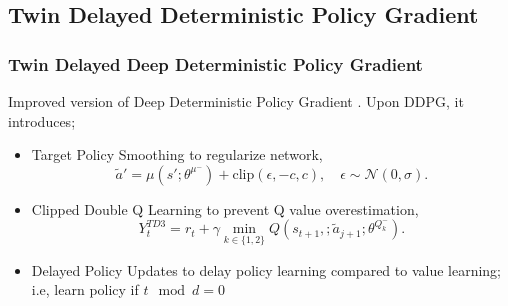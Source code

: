 \documentclass{beamer}
\begin{document}
\subsection{Twin Delayed Deterministic Policy Gradient}
\begin{frame}
\frametitle{Twin Delayed Deep Deterministic Policy Gradient}
Improved version of Deep Deterministic Policy Gradient \cite{fujimoto_addressing_2018}.
Upon DDPG, it introduces;
\begin{itemize}
	\item Target Policy Smoothing to regularize network,
	\begin{equation}
	\label{eqn:td3_target_action}
	\widetilde{a}' = \mu(s';\theta^{\mu^-}) + \text{clip}(\epsilon, -c, c), \quad \epsilon \sim \mathcal{N}(0, \sigma).
	\end{equation}
	\item Clipped Double Q Learning to prevent Q value overestimation,
	\begin{equation}
	\label{eqn:td3_target}
	Y_t^{TD3} = r_t + \gamma \min_{k\in\{1,2\}} Q(s_{t+1}, ;\widetilde{a}_{j+1};\theta^{Q_k^-}).
	\end{equation}
	\item Delayed Policy Updates to delay policy learning compared to value learning; i.e, learn policy if $t\mod d = 0$
\end{itemize}
\end{frame}
\end{document}

